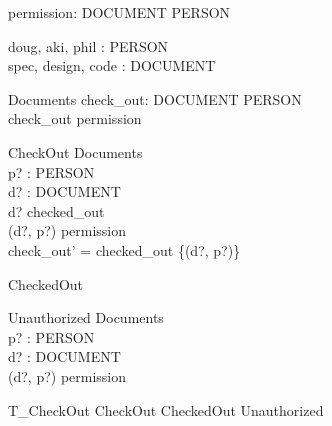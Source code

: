 \documentclass{llncs}
\begin{document}
\begin{zed}
\end{zed}

\begin{axdef}
permission: DOCUMENT \rel PERSON
\end{axdef}

\begin{axdef}
doug, aki, phil : PERSON \\
spec, design, code : DOCUMENT
\end{axdef}

\begin{schema}{Documents}
check\_out: DOCUMENT \pfun PERSON \\
\ST check\_out \subseteq permission
\end{schema}

\begin{schema}{CheckOut}
\Delta Documents \\
p? : PERSON \\
d? : DOCUMENT \\
\ST d? \notin \dom checked\_out \\
(d?, p?) \in permission \\
check\_out' = checked\_out \uni \{(d?, p?)\}
\end{schema}

\begin{zed}
CheckedOut 
\end{zed}

\begin{schema}{Unauthorized}
\Xi Documents \\
p? : PERSON \\
d? : DOCUMENT \\
\ST (d?, p?) \notin permission
\end{schema}

\begin{zed}
T\_CheckOut \sdef CheckOut \lor CheckedOut \lor Unauthorized
\end{zed}
\end{document}
